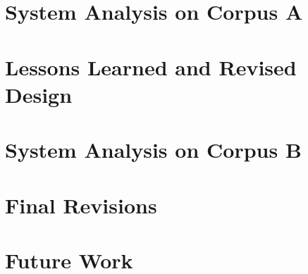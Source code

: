 \documentclass[11pt,letterpaper]{article}
\begin{document}
\section{System Analysis on Corpus A}

\section{Lessons Learned and Revised Design}

\section{System Analysis on Corpus B}

\section{Final Revisions}

\section{Future Work}








\label{lastpage}
\end{document}
